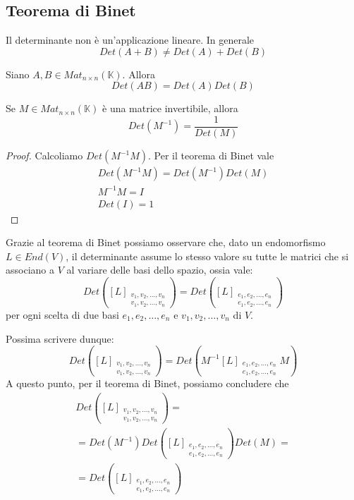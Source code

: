 
\subsection{Teorema di Binet}
Il determinante non \`e un'applicazione lineare. In generale
\[ Det(A + B) \neq Det(A) + Det(B) \]

\begin{theorem}
	Siano $A, B \in Mat_{n \times n}(\mathbb{K})$. Allora
	\begin{equation*}
		Det(AB) = Det(A)Det(B)
	\end{equation*}
\end{theorem}

\begin{corollary}
	Se $M \in Mat_{n \times n}(\mathbb{K})$ \`e una matrice invertibile, allora
	\begin{equation*}
		Det(M^{-1}) = \frac{1}{Det(M)}
	\end{equation*}
	\begin{proof}
		Calcoliamo $Det(M^{-1} M)$. Per il teorema di Binet vale
		\begin{gather*}
			Det(M^{-1} M) = Det(M^{-1})Det(M) \\
			M^{-1}M = I \\
			Det(I) = 1
		\end{gather*}
	\end{proof}
\end{corollary}

Grazie al teorema di Binet possiamo osservare che, dato un endomorfismo
$L \in End(V)$, il determinante assume lo stesso valore su tutte le matrici
che si associano a $V$ al variare delle basi dello spazio, ossia vale:
\begin{equation*}
	Det \left(
	[L]_{\substack{
			v_1, v_2, \dots, v_n \\
			v_1, v_2, \dots, v_n
		}}
	\right) =
	Det \left(
	[L]_{\substack{
			e_1, e_2, \dots, e_n \\
			e_1, e_2, \dots, e_n
		}}
	\right)
\end{equation*}
per ogni scelta di due basi $e_1, e_2, \dots, e_n$ e $v_1, v_2, \dots, v_n$
di $V$.

Possima scrivere dunque:
\begin{equation*}
	Det \left(
	[L]_{\substack{
			v_1, v_2, \dots, v_n \\
			v_1, v_2, \dots, v_n
		}}
	\right) =
	Det \left(
	M^{-1}[L]_{\substack{
			e_1, e_2, \dots, e_n \\
			e_1, e_2, \dots, e_n
		}} M
	\right)
\end{equation*}
A questo punto, per il teorema di Binet, possiamo concludere che
\begin{gather*}
	Det \left(
	[L]_{\substack{
			v_1, v_2, \dots, v_n \\
			v_1, v_2, \dots, v_n
		}}
	\right) = \\
	= Det(M^{-1}) Det \left(
	[L]_{\substack{
			e_1, e_2, \dots, e_n \\
			e_1, e_2, \dots, e_n
		}}
	\right) Det(M) = \\
	= Det \left(
	[L]_{\substack{
			e_1, e_2, \dots, e_n \\
			e_1, e_2, \dots, e_n
		}}
	\right)
\end{gather*}

